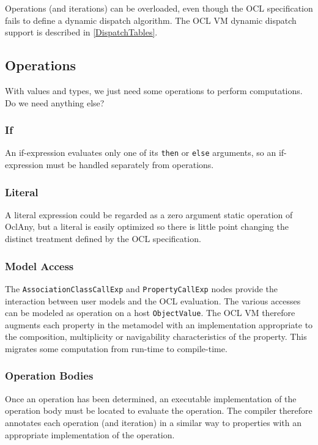 \documentclass{sig-alternate}
\begin{document}
Operations (and iterations)  can be overloaded, even though the OCL specification fails to define a dynamic dispatch algorithm. The OCL VM dynamic dispatch support is described in \ref{DispatchTables}.

\subsection{Operations}

With values and types, we just need some operations to perform computations. Do we need anything else?

\subsubsection{If}

An if-expression evaluates only one of its \verb|then| or \verb|else| arguments, so an if-expression must be handled separately from operations.

\subsubsection{Literal}

A literal expression could be regarded as a zero argument static operation of OclAny, but a literal is easily optimized so there is little point changing the distinct treatment defined by the OCL specification.

\subsubsection{Model Access}

The \verb|AssociationClassCallExp| and \verb|PropertyCallExp| nodes provide the interaction between user models and the OCL evaluation. The various accesses can be modeled as operation on a host \verb|ObjectValue|. The OCL VM therefore augments each property in the metamodel with an implementation appropriate to the composition, multiplicity or navigability characteristics of the property. This migrates some computation from run-time to compile-time.

\subsubsection{Operation Bodies}

Once an operation has been determined, an executable implementation of the operation body must be located to evaluate the operation. The compiler therefore annotates each operation (and iteration) in a similar way to properties with an appropriate implementation of the operation.
\end{document}
